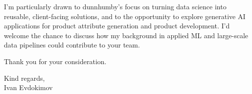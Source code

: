 \documentclass[11pt]{letter}
\begin{document}
I'm particularly drawn to dunnhumby's focus on turning data science into reusable, client-facing solutions, and to the opportunity to explore generative AI applications for product attribute generation and product development. I'd welcome the chance to discuss how my background in applied ML and large-scale data pipelines could contribute to your team.

Thank you for your consideration.

Kind regards,\\
Ivan Evdokimov
\end{document}
